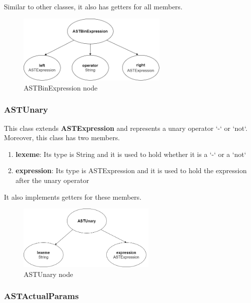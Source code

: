 \documentclass{article}
\begin{document}
					 Similar to other classes, it also has getters for all members.
					 
					 
					\begin{figure}[H]
					\centering
			 			\includegraphics[width=0.65\textwidth]{astbinexpr.png}
			  			\caption{ASTBinExpression node}
			  			\label{fig:astbinexpr}
					\end{figure}
					
					\subsubsection{ASTUnary}
					This class extends \textbf{ASTExpression} and represents a unary operator `-` or `not`. Moreover, this class has two members. 		
					
					\begin{enumerate}
					\item \textbf{lexeme}: Its type is String and it is used to hold whether it is a  `-` or a `not`
					\item \textbf{expression}: Its type is ASTExpression and it is used to hold the expression after the unary operator
					\end{enumerate}
					
					 It also implements getters for these members.
					 
					\begin{figure}[H]
					\centering
			 			\includegraphics[width=0.6\textwidth]{astunary.png}
			  			\caption{ASTUnary node}
			  			\label{fig:astunary}
					\end{figure}
					
					\subsubsection{ASTActualParams}
					
\end{document}
